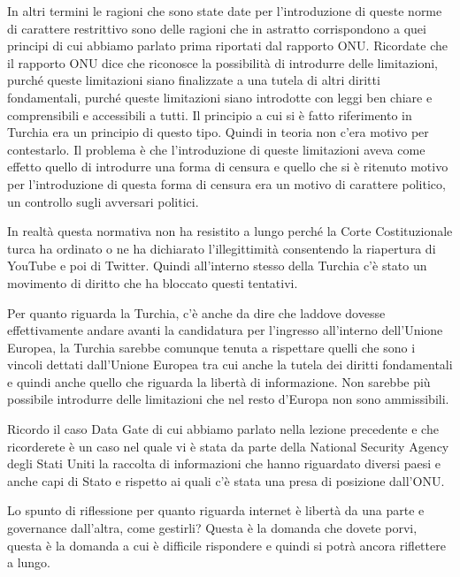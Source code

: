 In altri termini le ragioni che sono state date per l'introduzione di queste norme di carattere restrittivo sono delle ragioni che in astratto corrispondono a quei principi di cui abbiamo parlato prima riportati dal rapporto ONU. Ricordate che il rapporto ONU dice che riconosce la possibilità di introdurre delle limitazioni, purché queste limitazioni siano finalizzate a una tutela di altri diritti fondamentali, purché queste limitazioni siano introdotte con leggi ben chiare e comprensibili e accessibili a tutti. Il principio a cui si è fatto riferimento in Turchia era un principio di questo tipo.
Quindi in teoria non c'era motivo per contestarlo. Il problema è che l'introduzione di queste limitazioni aveva come effetto quello di introdurre una forma di censura e quello che si è ritenuto motivo per l'introduzione di questa forma di censura era un motivo di carattere politico, un controllo sugli avversari politici.

In realtà questa normativa non ha resistito a lungo perché la Corte Costituzionale turca ha ordinato o ne ha dichiarato l'illegittimità consentendo la riapertura di YouTube e poi di Twitter. Quindi all'interno stesso della Turchia c'è stato un movimento di diritto che ha bloccato questi tentativi.

Per quanto riguarda la Turchia, c'è anche da dire che laddove dovesse effettivamente andare avanti la candidatura per l'ingresso all'interno dell'Unione Europea, la Turchia sarebbe comunque tenuta a rispettare quelli che sono i vincoli dettati dall'Unione Europea tra cui anche la tutela dei diritti fondamentali e quindi anche quello che riguarda la libertà di informazione. Non sarebbe più possibile introdurre delle limitazioni che nel resto d'Europa non sono ammissibili.

Ricordo il caso Data Gate di cui abbiamo parlato nella lezione precedente e che ricorderete è un caso nel quale vi è stata da parte della National Security Agency degli Stati Uniti la raccolta di informazioni che hanno riguardato diversi paesi e anche capi di Stato e rispetto ai quali c'è stata una presa di posizione dall'ONU.

Lo spunto di riflessione per quanto riguarda internet è libertà da una parte e governance dall'altra, come gestirli? Questa è la domanda che dovete porvi, questa è la domanda a cui è difficile rispondere e quindi si potrà ancora riflettere a lungo.